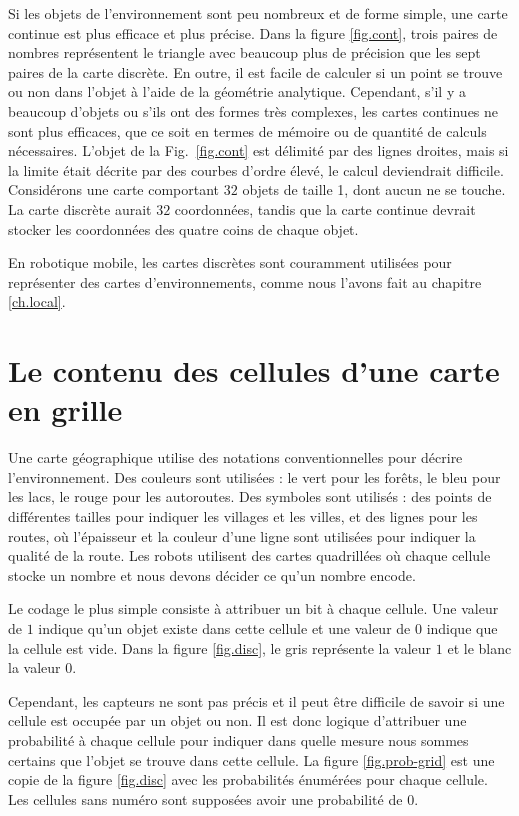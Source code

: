 Si les objets de l'environnement sont peu nombreux et de forme simple, une carte continue est plus efficace et plus précise. Dans la figure \ref{fig.cont}, trois paires de nombres représentent le triangle avec beaucoup plus de précision que les sept paires de la carte discrète. En outre, il est facile de calculer si un point se trouve ou non dans l'objet à l'aide de la géométrie analytique. Cependant, s'il y a beaucoup d'objets ou s'ils ont des formes très complexes, les cartes continues ne sont plus efficaces, que ce soit en termes de mémoire ou de quantité de calculs nécessaires. L'objet de la Fig.~\ref{fig.cont} est délimité par des lignes droites, mais si la limite était décrite par des courbes d'ordre élevé, le calcul deviendrait difficile. Considérons une carte comportant $32$ objets de taille 1, dont aucun ne se touche. La carte discrète aurait $32$ coordonnées, tandis que la carte continue devrait stocker les coordonnées des quatre coins de chaque objet.

En robotique mobile, les cartes discrètes sont couramment utilisées pour représenter des cartes d'environnements, comme nous l'avons fait au chapitre \ref{ch.local}.

\section{Le contenu des cellules d'une carte en grille}\label{s.grids}

Une carte géographique utilise des notations conventionnelles pour décrire l'environnement. Des couleurs sont utilisées : le vert pour les forêts, le bleu pour les lacs, le rouge pour les autoroutes. Des symboles sont utilisés : des points de différentes tailles pour indiquer les villages et les villes, et des lignes pour les routes, où l'épaisseur et la couleur d'une ligne sont utilisées pour indiquer la qualité de la route. Les robots utilisent des cartes quadrillées où chaque cellule stocke un nombre et nous devons décider ce qu'un nombre encode.

Le codage le plus simple consiste à attribuer un bit à chaque cellule. Une valeur de $1$ indique qu'un objet existe dans cette cellule et une valeur de $0$ indique que la cellule est vide. Dans la figure \ref{fig.disc}, le gris représente la valeur $1$ et le blanc la valeur $0$.

Cependant, les capteurs ne sont pas précis et il peut être difficile de savoir si une cellule est occupée par un objet ou non. Il est donc logique d'attribuer une probabilité à chaque cellule pour indiquer dans quelle mesure nous sommes certains que l'objet se trouve dans cette cellule. La figure \ref{fig.prob-grid} est une copie de la figure \ref{fig.disc} avec les probabilités énumérées pour chaque cellule. Les cellules sans numéro sont supposées avoir une probabilité de $0$.


